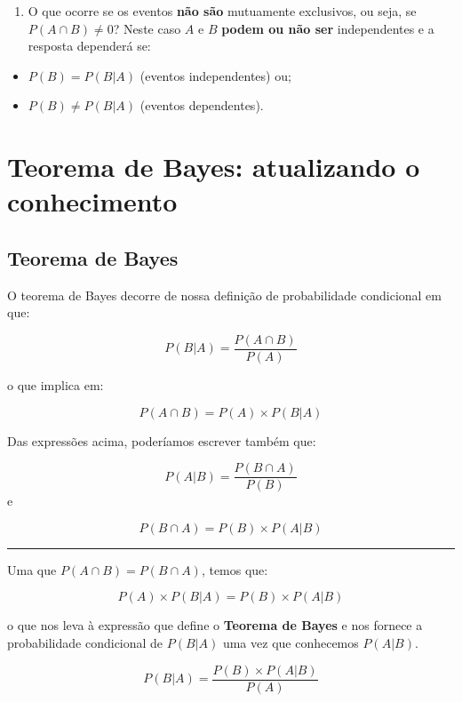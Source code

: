 \documentclass[
]{book}
\providecommand{\tightlist}{%
  \setlength{\itemsep}{0pt}\setlength{\parskip}{0pt}}
\begin{document}
\begin{enumerate}
\def\labelenumi{\arabic{enumi}.}
\setcounter{enumi}{6}
\tightlist
\item
  O que ocorre se os eventos \textbf{não são} mutuamente exclusivos, ou seja, se \(P(A \cap B) \ne 0\)? Neste caso \(A\) e \(B\) \textbf{podem ou não ser} independentes e a resposta dependerá se:
\end{enumerate}

\begin{itemize}
\tightlist
\item
  \(P(B) = P(B|A)\) (eventos independentes) ou;
\item
  \(P(B) \ne P(B|A)\) (eventos dependentes).
\end{itemize}

\hypertarget{tbayes}{%
\chapter{Teorema de Bayes: atualizando o conhecimento}\label{tbayes}}

\hypertarget{teorema-de-bayes}{%
\section{Teorema de Bayes}\label{teorema-de-bayes}}

O teorema de Bayes decorre de nossa definição de probabilidade condicional em que:

\[P(B|A) = \frac{P(A \cap B)}{P(A)}\]

o que implica em:

\[P(A \cap B) = P(A) \times P(B|A)\]

Das expressões acima, poderíamos escrever também que:

\[P(A|B) = \frac{P(B \cap A)}{P(B)}\]
e

\[P(B \cap A) = P(B) \times P(A|B)\]

\begin{center}\rule{0.5\linewidth}{0.5pt}\end{center}

Uma que \(P(A \cap B) = P(B \cap A)\), temos que:

\[P(A) \times P(B|A) = P(B) \times P(A|B)\]

o que nos leva à expressão que define o \textbf{Teorema de Bayes} e nos fornece a probabilidade condicional de \(P(B|A)\) uma vez que conhecemos \(P(A|B)\).

\[P(B|A) = \frac{P(B) \times P(A|B)}{P(A)}\]
\end{document}
